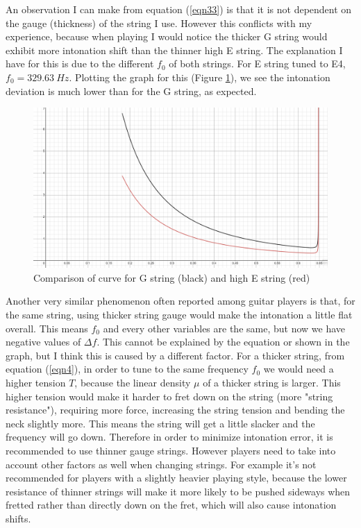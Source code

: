 An observation I can make from equation (\ref{eqn33}) is that it is not dependent on the gauge (thickness) of the string I use. However this conflicts with my experience, because when playing I would notice the thicker G string would exhibit more intonation shift than the thinner high E string. The explanation I have for this is due to the different $f_0$ of both strings. For E string tuned to E4, $f_0 = \SI{329.63}{Hz}$. Plotting the graph for this (Figure \ref{fig11}), we see the intonation deviation is much lower than for the G string, as expected.\par
\FloatBarrier
\begin{figure} [!htb]
    \includegraphics[width = \textwidth]{./ee/compare_graph_f.png} 
    \caption{Comparison of curve for G string (black) and high E string (red)}\label{fig11}
\end{figure}
Another very similar phenomenon often reported among guitar players is that, for the same string, using thicker string gauge would make the intonation a little flat overall. This means $f_0$ and every other variables are the same, but now we have negative values of $\Delta f$. This cannot be explained by the equation or shown in the graph, but I think this is caused by a different factor. For a thicker string, from equation (\ref{eqn4}), in order to tune to the same frequency $f_0$ we would need a higher tension $T$, because the linear density $\mu$ of a thicker string is larger. This higher tension would make it harder to fret down on the string (more "string resistance"), requiring more force, increasing the string tension and bending the neck slightly more. This means the string will get a little slacker and the frequency will go down. Therefore in order to minimize intonation error, it is recommended to use thinner gauge strings. However players need to take into account other factors as well when changing strings. For example it's not recommended for players with a slightly heavier playing style, because the lower resistance of thinner strings will make it more likely to be pushed sideways when fretted rather than directly down on the fret, which will also cause intonation shifts.\par

